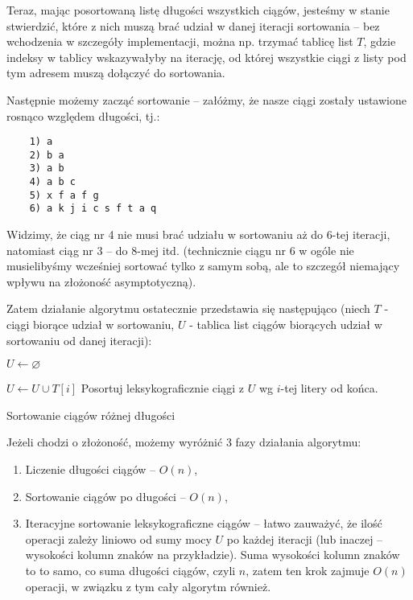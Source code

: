 Teraz, mając posortowaną listę długości wszystkich ciągów, jesteśmy w stanie stwierdzić, które z nich muszą brać udział w danej iteracji sortowania -- bez wchodzenia w szczegóły implementacji, można np. trzymać tablicę list $T$, gdzie indeksy w tablicy wskazywałyby na iterację, od której wszystkie ciągi z listy pod tym adresem muszą dołączyć do sortowania.

Następnie możemy zacząć sortowanie -- załóżmy, że nasze ciągi zostały ustawione rosnąco względem długości, tj.:

\begin{verbatim}
    1) a
    2) b a
    3) a b
    4) a b c
    5) x f a f g
    6) a k j i c s f t a q
\end{verbatim}

Widzimy, że ciąg nr 4 nie musi brać udziału w sortowaniu aż do 6-tej iteracji, natomiast ciąg nr 3 -- do 8-mej itd. (technicznie ciągu nr 6 w ogóle nie musielibyśmy wcześniej sortować tylko z samym sobą, ale to szczegół niemający wpływu na złożoność asymptotyczną).

Zatem działanie algorytmu ostatecznie przedstawia się następująco (niech $T$ - ciągi biorące udział w sortowaniu, $U$ - tablica list ciągów biorących udział w sortowaniu od danej iteracji):

\begin{algorithm}[h]
  \DontPrintSemicolon
  
  $U \leftarrow \varnothing$
  
  {
    {
      $U \leftarrow U \cup T[i]$
    }
    Posortuj leksykograficznie ciągi z $U$ wg $i$-tej litery od końca.
  }
  
  \caption{Sortowanie ciągów różnej długości}
  \label{var-len-sort}
\end{algorithm}

Jeżeli chodzi o złożoność, możemy wyróżnić 3 fazy działania algorytmu:

\begin{enumerate}
    \item Liczenie długości ciągów -- $O(n)$,
    \item Sortowanie ciągów po długości -- $O(n)$,
    \item Iteracyjne sortowanie leksykograficzne ciągów -- łatwo zauważyć, że ilość operacji zależy liniowo od sumy mocy $U$ po każdej iteracji (lub inaczej -- wysokości kolumn znaków na przykładzie). Suma wysokości kolumn znaków to to samo, co suma długości ciągów, czyli $n$, zatem ten krok zajmuje $O(n)$ operacji, w związku z tym cały algorytm również.
\end{enumerate}
